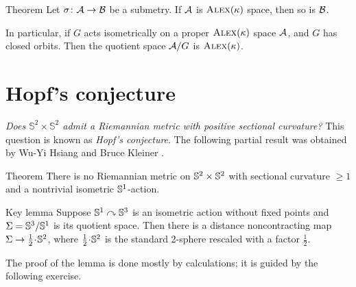 \begin{thm}{Theorem}\label{thm:submetry-CBB-1}
Let $\sigma\colon\mathcal{A}\to\mathcal{B}$ be a submetry.
If $\mathcal{A}$ is $\textsc{Alex}(\kappa)$ space, then so is $\mathcal{B}$.

In particular, if $G$ acts isometrically on a proper $\textsc{Alex}(\kappa)$ space $\mathcal{A}$, and $G$ has closed orbits.
Then the quotient space $\mathcal{A}/G$ is $\textsc{Alex}(\kappa)$.
\end{thm}

\section{Hopf's conjecture}

\textit{Does $\mathbb{S}^2\times\mathbb{S}^2$ admit a Riemannian metric with positive sectional curvature?}
This question is known as \emph{Hopf's conjecture}.
The following partial result was obtained by Wu-Yi Hsiang and Bruce Kleiner \cite{hsiang-kleiner}.

\begin{thm}{Theorem}\label{thm:hsiang-kleiner}
There is no Riemannian metric on $\mathbb{S}^2\times\mathbb{S}^2$ with sectional curvature $\ge 1$ and a nontrivial isometric $\mathbb{S}^1$-action.
\end{thm}


\begin{thm}{Key lemma}\label{lem:S^3/S^1}
Suppose $\mathbb{S}^1\curvearrowright\mathbb{S}^3$ is an isometric action without fixed points 
and $\Sigma=\mathbb{S}^3/\mathbb{S}^1$ is its quotient space.
Then there is a distance noncontracting map $\Sigma\to \tfrac12\cdot \SSS^2$, where $\tfrac12\cdot \SSS^2$ is the standard 2-sphere rescaled with a factor $\tfrac12$.
\end{thm}

The proof of the lemma is done mostly by calculations;
it is guided by the following exercise.

